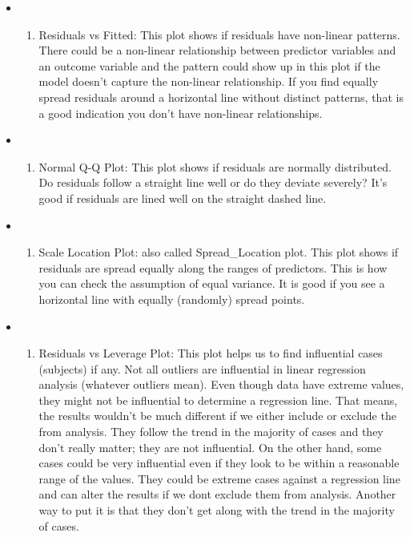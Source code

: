 \documentclass[
]{article}
\providecommand{\tightlist}{%
  \setlength{\itemsep}{0pt}\setlength{\parskip}{0pt}}
\begin{document}
\begin{itemize}
\item
  \begin{enumerate}
  \def\labelenumi{\Alph{enumi})}
  \tightlist
  \item
    Residuals vs Fitted: This plot shows if residuals have non-linear
    patterns. There could be a non-linear relationship between predictor
    variables and an outcome variable and the pattern could show up in
    this plot if the model doesn't capture the non-linear relationship.
    If you find equally spread residuals around a horizontal line
    without distinct patterns, that is a good indication you don't have
    non-linear relationships.
  \end{enumerate}
\item
  \begin{enumerate}
  \def\labelenumi{\Alph{enumi})}
  \setcounter{enumi}{1}
  \tightlist
  \item
    Normal Q-Q Plot: This plot shows if residuals are normally
    distributed. Do residuals follow a straight line well or do they
    deviate severely? It's good if residuals are lined well on the
    straight dashed line.
  \end{enumerate}
\item
  \begin{enumerate}
  \def\labelenumi{\Alph{enumi})}
  \setcounter{enumi}{2}
  \tightlist
  \item
    Scale Location Plot: also called Spread\_Location plot. This plot
    shows if residuals are spread equally along the ranges of
    predictors. This is how you can check the assumption of equal
    variance. It is good if you see a horizontal line with equally
    (randomly) spread points.
  \end{enumerate}
\item
  \begin{enumerate}
  \def\labelenumi{\Alph{enumi})}
  \setcounter{enumi}{3}
  \tightlist
  \item
    Residuals vs Leverage Plot: This plot helps us to find influential
    cases (subjects) if any. Not all outliers are influential in linear
    regression analysis (whatever outliers mean). Even though data have
    extreme values, they might not be influential to determine a
    regression line. That means, the results wouldn't be much different
    if we either include or exclude the from analysis. They follow the
    trend in the majority of cases and they don't really matter; they
    are not influential. On the other hand, some cases could be very
    influential even if they look to be within a reasonable range of the
    values. They could be extreme cases against a regression line and
    can alter the results if we dont exclude them from analysis. Another
    way to put it is that they don't get along with the trend in the
    majority of cases.
  \end{enumerate}
\end{itemize}
\end{document}
